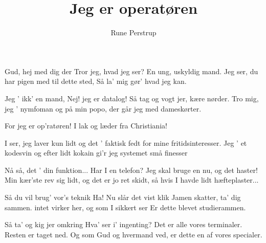 \documentclass[a4paper,11pt]{article}
\title{Jeg er operatøren}
\author{Rune Perstrup}
\begin{document}
\twocolumn[
\maketitle
]

\begin{song} 
Gud, hej med dig der
        Tror jeg, hvad jeg ser?
        En ung, uskyldig mand.
        Jeg ser, du har pigen med
        til dette sted,
        Så la' mig gør' hvad jeg kan.

        Jeg ' ikk' en mand,
        Nej! jeg er datalog!
        Så tag og vogt jer, kære nørder.
        Tro mig, jeg ' nymfoman
        og på min popo,
        der går jeg med dameskørter.

        {}
        For jeg er op'ratøren!
        I lak og læder
        fra Christiania!
        
        I ser, jeg laver kun lidt
        og det ' faktisk fedt
        for mine fritidsinteresser.
        Jeg ' et kodesvin
        og efter lidt kokain
        gi'r jeg systemet små finesser

 Nå så, det ' din funktion...
        Har I en telefon?
        Jeg skal bruge en nu, og det haster!
        Min kær'ste rev sig lidt,
        og det er jo ret skidt,
        så hvis I havde lidt hæfteplaster...

  Så du vil brug' vor's teknik
        Ha! Nu slår det vist klik
        Jamen skatter, ta' dig sammen.
        intet virker her,
        og som I sikkert ser
        Er dette blevet studierammen.

        {}

        Så ta' og kig jer omkring
        Hva' ser i' ingenting?
        Det er alle vores terminaler.
        Resten er taget ned.
        Og som Gud og hvermand ved,
        er dette en af vores specialer.

        {}

      \end{song}
    
\end{document}
